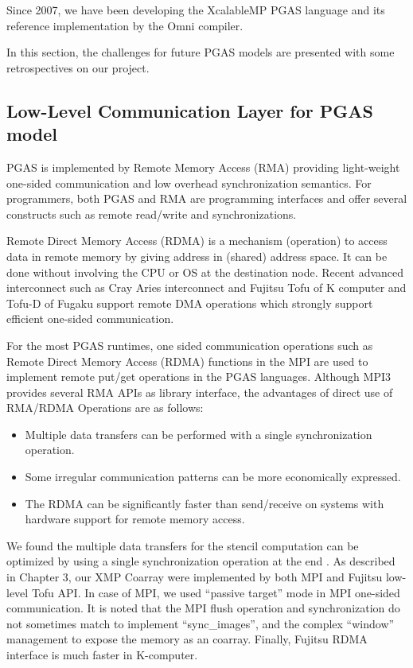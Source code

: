 ﻿\documentclass[graybox]{svmult}
\begin{document}
Since 2007, we have been developing the XcalableMP PGAS language and its reference implementation by the Omni compiler.

In this section, the challenges for future PGAS models are presented with some retrospectives on our project.

\subsection{Low-Level Communication Layer for PGAS model}

PGAS is implemented by Remote Memory Access (RMA) providing light-weight one-sided communication and low overhead synchronization semantics.
For programmers, both PGAS and RMA are programming interfaces and offer several constructs such as remote read/write and synchronizations.

Remote Direct Memory Access (RDMA) is a mechanism (operation) to access data in remote memory by giving address in (shared) address space. 
It can be done without involving the CPU or OS at the destination node.
Recent advanced interconnect such as Cray Aries interconnect and Fujitsu Tofu of K computer and Tofu-D of Fugaku support remote DMA operations which strongly support efficient one-sided communication.

For the most PGAS runtimes, one sided communication operations such as Remote Direct Memory Access (RDMA) functions in the MPI are used to implement remote put/get operations in the PGAS languages.
Although MPI3 provides several RMA APIs as library interface,
the advantages of direct use of RMA/RDMA Operations are as follows:
\begin{itemize}
\item Multiple data transfers can be performed with a single synchronization operation.
\item Some irregular communication patterns can be more economically expressed.
\item The RDMA can be significantly faster than send/receive on systems with hardware support for remote memory access.
\end{itemize}

We found the multiple data transfers for the stencil computation can be optimized by using a single synchronization operation at the end \cite{Iwashita2018}.
As described in Chapter 3, our XMP Coarray were implemented by both MPI and Fujitsu low-level Tofu API. In case of MPI, we used “passive target” mode in MPI one-sided communication. It is noted that the MPI flush operation and synchronization do not sometimes match to implement “sync\_images”, and the complex “window” management to expose the memory as an coarray.
Finally, Fujitsu RDMA interface is much faster in K-computer.
\end{document}
